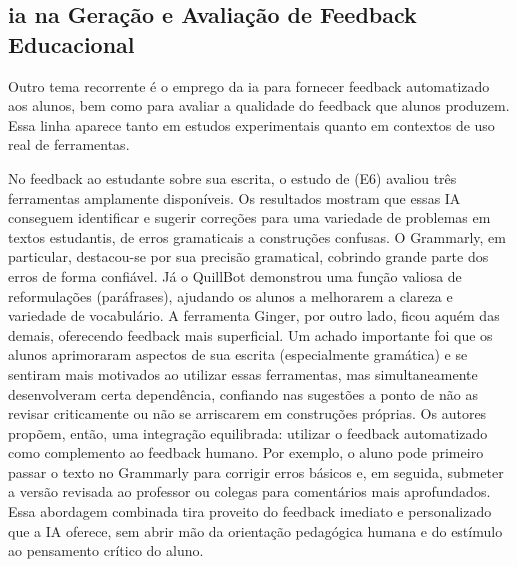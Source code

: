\subsection{\texorpdfstring{\gls{ia}}{IA} na Geração e Avaliação de Feedback Educacional}
\label{subsec:ia-avaliacao}
Outro tema recorrente é o emprego da \gls{ia} para fornecer feedback automatizado aos alunos, bem como para avaliar a qualidade do feedback que alunos produzem. Essa linha aparece tanto em estudos experimentais quanto em contextos de uso real de ferramentas. 

No feedback ao estudante sobre sua escrita, o estudo de  (E6) avaliou três ferramentas amplamente disponíveis. Os resultados mostram que essas IA conseguem identificar e sugerir correções para uma variedade de problemas em textos estudantis, de erros gramaticais a construções confusas. O Grammarly, em particular, destacou-se por sua precisão gramatical, cobrindo grande parte dos erros de forma confiável. Já o QuillBot demonstrou uma função valiosa de reformulações (paráfrases), ajudando os alunos a melhorarem a clareza e variedade de vocabulário. A ferramenta Ginger, por outro lado, ficou aquém das demais, oferecendo feedback mais superficial. Um achado importante foi que os alunos aprimoraram aspectos de sua escrita (especialmente gramática) e se sentiram mais motivados ao utilizar essas ferramentas, mas simultaneamente desenvolveram certa dependência, confiando nas sugestões a ponto de não as revisar criticamente ou não se arriscarem em construções próprias. Os autores propõem, então, uma integração equilibrada: utilizar o feedback automatizado como complemento ao feedback humano. Por exemplo, o aluno pode primeiro passar o texto no Grammarly para corrigir erros básicos e, em seguida, submeter a versão revisada ao professor ou colegas para comentários mais aprofundados. Essa abordagem combinada tira proveito do feedback imediato e personalizado que a IA oferece, sem abrir mão da orientação pedagógica humana e do estímulo ao pensamento crítico do aluno. 


